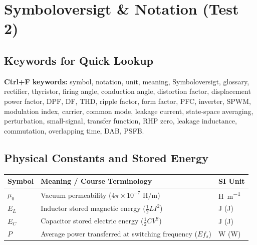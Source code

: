 \section{Symboloversigt \& Notation (Test 2)}

\subsection{Keywords for Quick Lookup}
\textbf{Ctrl+F keywords:} symbol, notation, unit, meaning, Symboloversigt, glossary, rectifier, thyristor, firing angle, conduction angle, distortion factor, displacement power factor, DPF, DF, THD, ripple factor, form factor, PFC, inverter, SPWM, modulation index, carrier, common mode, leakage current, state-space averaging, perturbation, small-signal, transfer function, RHP zero, leakage inductance, commutation, overlapping time, DAB, PSFB.

\subsection{Physical Constants and Stored Energy}
\begin{center}
\begin{tabular}{@{}lll@{}}
\toprule
\textbf{Symbol} & \textbf{Meaning / Course Terminology} & \textbf{SI Unit} \\
\midrule
$\mu_0$ & Vacuum permeability ($4\pi\times 10^{-7}\text{ H/m}$) & \si{\henry\per\meter} \\
$E_L$ & Inductor stored magnetic energy ($\tfrac{1}{2} L I^2$) & \si{\joule} (J) \\
$E_C$ & Capacitor stored electric energy ($\tfrac{1}{2} C V^2$) & \si{\joule} (J) \\
$P$ & Average power transferred at switching frequency ($E f_s$) & \si{\watt} (W) \\
\bottomrule
\end{tabular}
\end{center}

